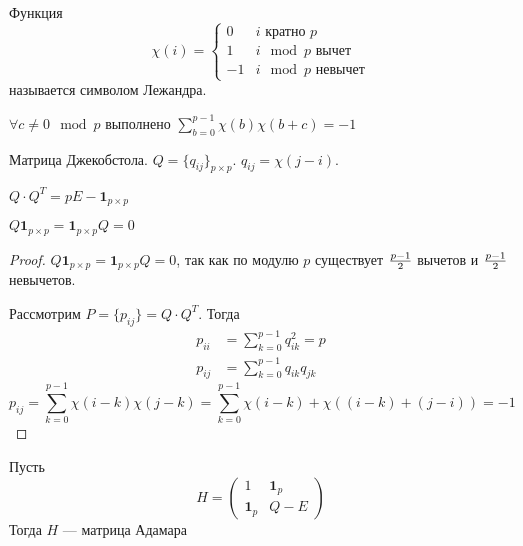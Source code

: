\begin{definition}
Функция
$$\chi(i) = \begin{cases} 0 & i \text{ кратно } p \\
                          1 & i \mod p \text{ вычет} \\
                          -1 & i \mod p \text{ невычет}
            \end{cases}$$
называется символом Лежандра.
\end{definition}

\begin{theorem}
$\forall c \neq 0 \mod p$ выполнено $\sum\limits_{b=0}^{p-1} \chi(b) \chi(b+c) = -1$
\end{theorem}

\begin{construction}
Матрица Джекобстола. $Q = \{q_{ij}\}_{p \times p}$. $q_{ij} = \chi(j-i)$.
\end{construction}

\begin{lemma}
$Q \cdot Q^{T} = p E - \mathbf{1}_{p \times p}$ 

$Q \mathbf{1}_{p \times p} = \mathbf{1}_{p \times p} Q = 0$
\end{lemma}
\begin{proof}
$Q \mathbf{1}_{p \times p} = \mathbf{1}_{p \times p} Q = 0$, так как по модулю
$p$ существует ${p-1 \over 2}$ вычетов и ${p-1 \over 2}$ невычетов.

Рассмотрим $P = \{p_{ij}\} = Q \cdot Q^{T}$. Тогда 
$$\begin{array}{rl} p_{ii} &= 
    \sum\limits_{k=0}^{p-1} q_{ik}^2 = p\\
    p_{ij} &= \sum\limits_{k=0}^{p-1} q_{ik} q_{jk} \end{array}$$
$$p_{ij} = \sum\limits_{k=0}^{p-1} \chi(i-k) \chi(j-k) =
   \sum\limits_{k=0}^{p-1} \chi(i-k) + \chi ((i-k) + (j-i)) = -1$$
\end{proof}

\begin{lemma}
Пусть
$$H = \begin{pmatrix} 1 & \mathbf{1}_p \\ \mathbf{1}_p & Q - E \end{pmatrix}$$
Тогда $H$ --- матрица Адамара
\end{lemma}

